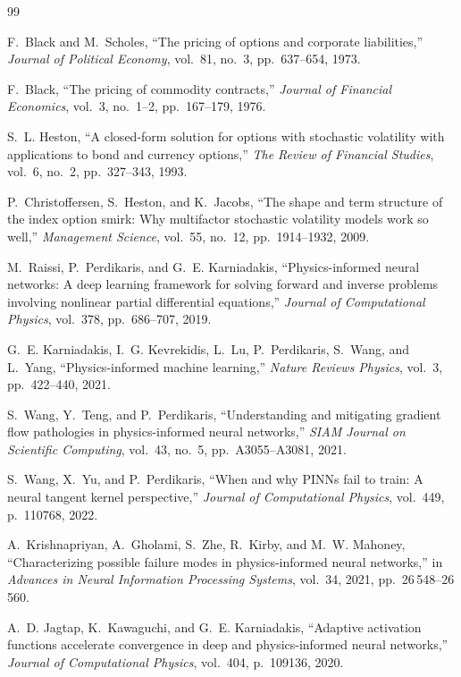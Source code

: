 \documentclass[conference]{IEEEtran}
\begin{document}
\begin{thebibliography}{99}

 F.~Black and M.~Scholes, ``The pricing of options and corporate liabilities,'' \emph{Journal of Political Economy}, vol.~81, no.~3, pp.~637--654, 1973.

 F.~Black, ``The pricing of commodity contracts,'' \emph{Journal of Financial Economics}, vol.~3, no.~1--2, pp.~167--179, 1976.

 S.~L. Heston, ``A closed-form solution for options with stochastic volatility with applications to bond and currency options,'' \emph{The Review of Financial Studies}, vol.~6, no.~2, pp.~327--343, 1993.

 P.~Christoffersen, S.~Heston, and K.~Jacobs, ``The shape and term structure of the index option smirk: Why multifactor stochastic volatility models work so well,'' \emph{Management Science}, vol.~55, no.~12, pp.~1914--1932, 2009.

 M.~Raissi, P.~Perdikaris, and G.~E. Karniadakis, ``Physics-informed neural networks: A deep learning framework for solving forward and inverse problems involving nonlinear partial differential equations,'' \emph{Journal of Computational Physics}, vol.~378, pp.~686--707, 2019.

 G.~E. Karniadakis, I.~G. Kevrekidis, L.~Lu, P.~Perdikaris, S.~Wang, and L.~Yang, ``Physics-informed machine learning,'' \emph{Nature Reviews Physics}, vol.~3, pp.~422--440, 2021.

 S.~Wang, Y.~Teng, and P.~Perdikaris, ``Understanding and mitigating gradient flow pathologies in physics-informed neural networks,'' \emph{SIAM Journal on Scientific Computing}, vol.~43, no.~5, pp.~A3055--A3081, 2021.

 S.~Wang, X.~Yu, and P.~Perdikaris, ``When and why PINNs fail to train: A neural tangent kernel perspective,'' \emph{Journal of Computational Physics}, vol.~449, p.~110768, 2022.

 A.~Krishnapriyan, A.~Gholami, S.~Zhe, R.~Kirby, and M.~W. Mahoney, ``Characterizing possible failure modes in physics-informed neural networks,'' in \emph{Advances in Neural Information Processing Systems}, vol.~34, 2021, pp.~26\,548--26\,560.

 A.~D. Jagtap, K.~Kawaguchi, and G.~E. Karniadakis, ``Adaptive activation functions accelerate convergence in deep and physics-informed neural networks,'' \emph{Journal of Computational Physics}, vol.~404, p.~109136, 2020.


\end{thebibliography}
\end{document}
